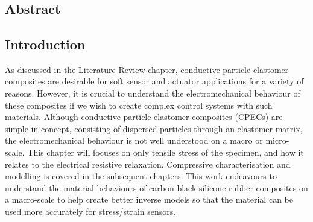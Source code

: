 \chapter{\chapiiiname}
\label{chapter3}

\section*{Abstract}




\section{Introduction}
\label{sec:ch3-intro}
As discussed in the Literature Review chapter, conductive particle elastomer composites are desirable for soft sensor and actuator applications for a variety of reasons. However, it is crucial to understand the electromechanical behaviour of these composites if we wish to create complex control systems with such materials. Although conductive particle elastomer composites (CPECs) are simple in concept, consisting of dispersed particles through an elastomer matrix, the electromechanical behaviour is not well understood on a macro or micro-scale. This chapter will focuses on only tensile stress of the specimen, and how it relates to the electrical resistive relaxation. Compressive characterisation and modelling is covered in the subsequent chapters. This work endeavours to understand the material behaviours of carbon black silicone rubber composites on a macro-scale to help create better inverse models so that the material can be used more accurately for stress/strain sensors. 



